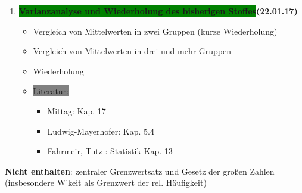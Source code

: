 \documentclass[a4paper,fontsize=16pt]{article}
\begin{document}
\begin{enumerate}
         \item{\textbf{\colorbox{green}{Varianzanalyse und Wiederholung des bisherigen Stoffes}(22.01.17)}
    \begin{itemize}
      \item{Vergleich von Mittelwerten in zwei Gruppen (kurze Wiederholung)}
      \item{Vergleich von Mittelwerten in drei und mehr Gruppen}
      \item{Wiederholung}
       \item{\colorbox{gray}{Literatur:} 
          \begin{itemize}
       \item{Mittag: Kap. 17}
       \item{Ludwig-Mayerhofer: Kap. 5.4}
       \item{Fahrmeir, Tutz : Statistik Kap. 13}
       \end{itemize}}
    \end{itemize}
  }
  
  
\end{enumerate}

\textbf{Nicht enthalten}: zentraler Grenzwertsatz und Gesetz der großen Zahlen (insbesondere W'keit als Grenzwert der rel. Häufigkeit) 


\end{document}
